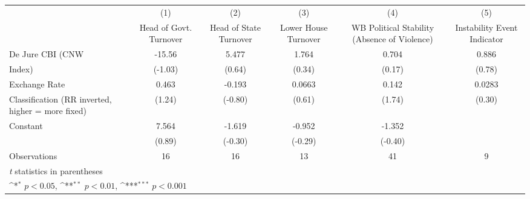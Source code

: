 {
\def\sym#1{\ifmmode^{#1}\else\(^{#1}\)\fi}
\begin{tabular}{l*{5}{c}}
\toprule
                &\multicolumn{1}{c}{(1)}&\multicolumn{1}{c}{(2)}&\multicolumn{1}{c}{(3)}&\multicolumn{1}{c}{(4)}&\multicolumn{1}{c}{(5)}\\
                &\multicolumn{1}{c}{Head of Govt. Turnover}&\multicolumn{1}{c}{Head of State Turnover}&\multicolumn{1}{c}{Lower House Turnover}&\multicolumn{1}{c}{WB Political Stability (Absence of Violence)}&\multicolumn{1}{c}{Instability Event Indicator}\\
\midrule
De Jure CBI (CNW&   -15.56         &    5.477         &    1.764         &    0.704         &    0.886         \\
Index)          &  (-1.03)         &   (0.64)         &   (0.34)         &   (0.17)         &   (0.78)         \\
\addlinespace
Exchange Rate   &    0.463         &   -0.193         &   0.0663         &    0.142         &   0.0283         \\
Classification (RR inverted, higher = more fixed)&   (1.24)         &  (-0.80)         &   (0.61)         &   (1.74)         &   (0.30)         \\
\addlinespace
Constant        &    7.564         &   -1.619         &   -0.952         &   -1.352         &                  \\
                &   (0.89)         &  (-0.30)         &  (-0.29)         &  (-0.40)         &                  \\
\midrule
Observations    &       16         &       16         &       13         &       41         &        9         \\
\bottomrule
\multicolumn{6}{l}{\footnotesize \textit{t} statistics in parentheses}\\
\multicolumn{6}{l}{\footnotesize \sym{*} \(p<0.05\), \sym{**} \(p<0.01\), \sym{***} \(p<0.001\)}\\
\end{tabular}
}
